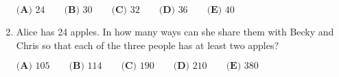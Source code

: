 \documentclass{article}
\begin{document}
\begin{enumerate}[label=\arabic*., itemsep=0.5em]
\(\textbf{(A) }24\qquad\textbf{(B) }30\qquad\textbf{(C) }32\qquad\textbf{(D) }36\qquad\textbf{(E) }40\)\par \vspace{0.5em}\item Alice has 24 apples. In how many ways can she share them with Becky and
Chris so that each of the three people has at least two apples?

\(\textbf{(A) }105\qquad\textbf{(B) }114\qquad\textbf{(C) }190\qquad\textbf{(D) }210\qquad\textbf{(E) }380\)\par \vspace{0.5em}
\end{enumerate}
\end{document}
